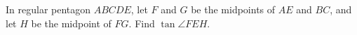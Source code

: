 In regular pentagon $ABCDE$, let $F$ and $G$ be the midpoints of $AE$ and $BC$, and let $H$ be the midpoint of $FG$. Find $\tan\angle FEH$.

